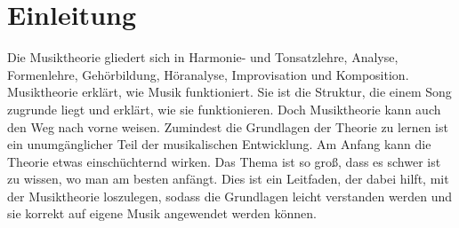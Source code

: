 \section{Einleitung}
Die Musiktheorie gliedert sich in Harmonie- und Tonsatzlehre, Analyse, 
Formenlehre, Gehörbildung, Höranalyse, Improvisation und Komposition.
Musiktheorie erklärt, wie Musik funktioniert. Sie ist die Struktur, die einem Song zugrunde liegt und erklärt, wie sie funktionieren. Doch Musiktheorie kann 
auch den Weg nach vorne weisen. Zumindest die Grundlagen der Theorie zu lernen ist ein 
unumgänglicher Teil der musikalischen Entwicklung. Am Anfang kann die Theorie etwas 
einschüchternd wirken. Das Thema ist so groß, dass es schwer ist zu wissen, wo man am 
besten anfängt. Dies ist ein Leitfaden, der dabei hilft, mit der Musiktheorie 
loszulegen, sodass die Grundlagen leicht verstanden werden und sie korrekt auf eigene 
Musik angewendet werden können.